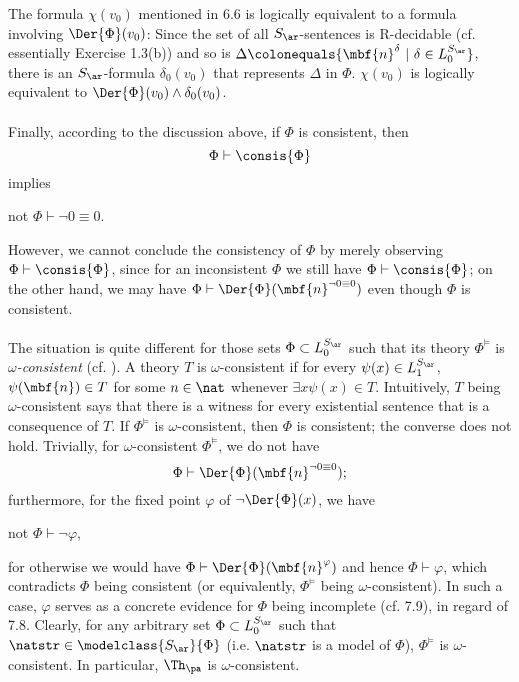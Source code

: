 \begin{enumerate}[1.]
\begin{center}
\end{center}
The formula $\chi(v_0)$ mentioned in 6.6 is logically equivalent to a formula involving $\Der{\Phi}(v_0)$: Since the set of all $S_\ar$-sentences is R-decidable (cf. essentially Exercise 1.3(b)) and so is $\Delta \colonequals \{ \mbf{n}^\delta \ | \ \delta \in L_0^{S_\ar} \}$, there is an $S_\ar$-formula $\delta_0(v_0)$ that represents $\Delta$ in $\Phi$. $\chi(v_0)$ is logically equivalent to $\Der{\Phi}(v_0) \land \delta_0(v_0)$.\\
\ \\
Finally, according to the discussion above, if $\Phi$ is consistent, then
\[
\Phi \vdash \consis{\Phi}
\]
implies
\begin{center}
not $\Phi \vdash \neg 0 \equiv 0$.
\end{center}
However, we cannot conclude the consistency of $\Phi$ by merely observing $\Phi \vdash \consis{\Phi}$, since for an inconsistent $\Phi$ we still have $\Phi \vdash \consis{\Phi}$; on the other hand, we may have $\Phi \vdash \Der{\Phi}(\mbf{n}^{\neg 0 \equiv 0})$ even though $\Phi$ is consistent.\\
\ \\
The situation is quite different for those sets $\Phi \subset L_0^{S_\ar}$ such that its theory $\Phi^{\models}$ is \emph{$\omega$-consistent} (cf. \cite{Dirk_van_Dalen}). A theory $T$ is $\omega$-consistent if for every $\psi(x) \in L_1^{S_\ar}$, $\psi(\mbf{n}) \in T$ for some $n \in \nat$ whenever $\exists x \psi(x) \in T$. Intuitively, $T$ being $\omega$-consistent says that there is a witness for every existential sentence that is a consequence of $T$. If $\Phi^{\models}$ is $\omega$-consistent, then $\Phi$ is consistent; the converse does not hold. Trivially, for $\omega$-consistent $\Phi^{\models}$, we do not have
\[
\Phi \vdash \Der{\Phi}(\mbf{n}^{\neg 0 \equiv 0});
\]
furthermore, for the fixed point $\varphi$ of $\neg\Der{\Phi}(x)$, we have
\begin{center}
not $\Phi \vdash \neg\varphi$,
\end{center}
for otherwise we would have $\Phi \vdash \Der{\Phi}(\mbf{n}^\varphi)$ and hence $\Phi \vdash \varphi$, which contradicts $\Phi$ being consistent (or equivalently, $\Phi^{\models}$ being $\omega$-consistent). In such a case, $\varphi$ serves as a concrete evidence for $\Phi$ being incomplete (cf. 7.9), in regard of 7.8. Clearly, for any arbitrary set $\Phi \subset L_0^{S_\ar}$ such that $\natstr \in \modelclass{S_\ar}{\Phi}$ (i.e. $\natstr$ is a model of $\Phi$), $\Phi^{\models}$ is $\omega$-consistent. In particular, $\Th_\pa$ is $\omega$-consistent.\\

\end{enumerate}
